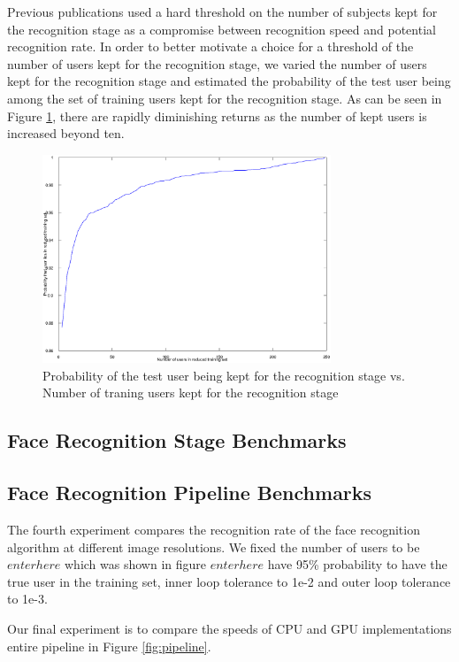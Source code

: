 \documentclass[10pt,twocolumn,letterpaper]{article}
\begin{document}
Previous publications used a hard threshold on the number of subjects kept for the recognition
stage as a compromise between recognition speed and potential recognition rate.
In order to better motivate 
a choice for a threshold of the number of users kept for the recognition stage,
we varied the number of users kept for the recognition stage and estimated the probability
of the test user being among the set of training users kept for the recognition stage.
As can be seen in Figure \ref{fig:user_alignment_rank_plot}, there are rapidly diminishing
returns as the number of kept users is increased beyond ten.  
\begin{figure}
\centering
\includegraphics[width=3.4in]{figures/user_alignment_rank_plot}
\caption{Probability of the test user being kept for the recognition stage vs. Number of traning
users kept for the recognition stage}
\label{fig:user_alignment_rank_plot}
\end{figure}

\subsection{Face Recognition Stage Benchmarks}
\label{sec:recognition_benchmark}

\subsection{Face Recognition Pipeline Benchmarks}
\label{sec:pipeline_benchmark}
The fourth experiment compares the recognition rate of the face recognition algorithm at different
image resolutions.  We fixed the number of users to be $enter here$ which was shown in figure  $enter here$  have 95\% probability
to have the true user in the training set, inner loop tolerance to 1e-2 and outer loop tolerance to 1e-3.  

Our final experiment is to compare the speeds of CPU and GPU implementations entire pipeline in Figure \ref{fig:pipeline}.
\end{document}
